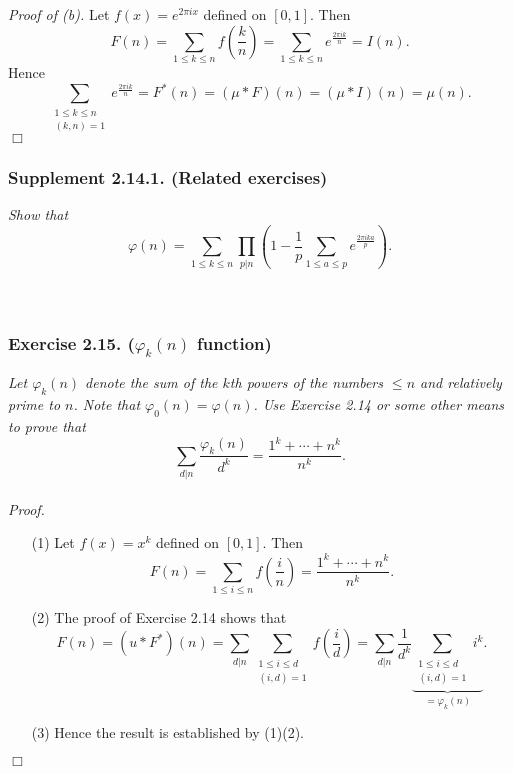 \documentclass{article}
\begin{document}
\emph{Proof of (b).}
  Let $f(x) = e^{2\pi i x}$ defined on $[0,1]$.
  Then
  \[
    F(n)
    = \sum_{1 \leq k \leq n} f\left( \frac{k}{n} \right)
    = \sum_{1 \leq k \leq n} e^{\frac{2\pi i k}{n}}
    = I(n).
  \]
  Hence
  \[
    \sum_{\substack{1 \leq k \leq n \\ (k,n)=1}} e^{\frac{2\pi i k}{n}}
    = F^{*}(n)
    = (\mu * F)(n)
    = (\mu * I)(n)
    = \mu(n).
  \]
$\Box$ \\



\subsubsection*{Supplement 2.14.1. (Related exercises)}
\emph{Show that
\[
  \varphi(n)
  = \sum_{1 \leq k \leq n}
      \prod_{p|n}\left( 1 - \frac{1}{p} \sum_{1 \leq a \leq p} e^{\frac{2\pi i ka}{p}} \right).
\]} \\\\






\subsubsection*{Exercise 2.15. ($\varphi_k(n)$ function)}
\emph{Let $\varphi_k(n)$ denote the sum of the $k$th powers of
the numbers $\leq n$ and relatively prime to $n$.
Note that $\varphi_0(n) = \varphi(n)$.
Use Exercise 2.14 or some other means to prove that
\[
  \sum_{d|n} \frac{\varphi_k(n)}{d^k} = \frac{1^k + \cdots + n^k}{n^k}.
\]} \\



\emph{Proof.}
\begin{enumerate}
\item[(1)]
  Let $f(x) = x^k$ defined on $[0,1]$.
  Then
  \[
    F(n)
    = \sum_{1 \leq i \leq n} f\left( \frac{i}{n} \right)
    = \frac{1^k + \cdots + n^k}{n^k}.
  \]

\item[(2)]
  The proof of Exercise 2.14 shows that
  \[
    F(n)
    = (u * F^{*})(n)
    = \sum_{d|n} \sum_{\substack{1 \leq i \leq d \\ (i,d)=1}} f\left( \frac{i}{d} \right)
    = \sum_{d|n} \frac{1}{d^k}
      \underbrace{\sum_{\substack{1 \leq i \leq d \\ (i,d)=1}} i^k}_{= \varphi_k(n)}.
  \]

\item[(3)]
  Hence the result is established by (1)(2).
\end{enumerate}
$\Box$ \\\\
\end{document}
